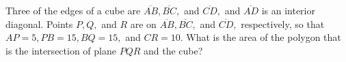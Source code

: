 Three of the edges of a cube are $\overline{AB}, \overline{BC},$ and $\overline{CD},$ and $\overline{AD}$ is an interior diagonal.  Points $P, Q,$ and $R$ are on $\overline{AB}, \overline{BC},$ and $\overline{CD},$ respectively, so that $AP=5, PB=15, BQ=15,$ and $CR=10.$  What is the area of the polygon that is the intersection of plane $PQR$ and the cube?